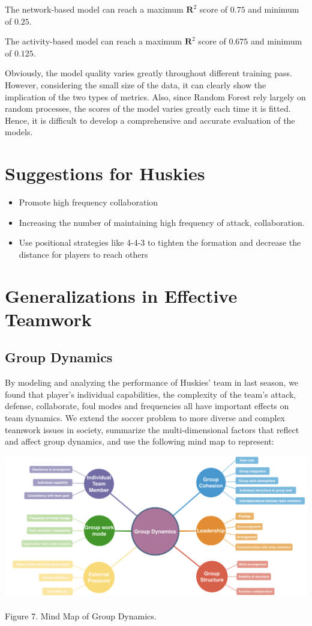 \documentclass{mcmthesis}
\begin{document}
The network-based model can reach a maximum $\mathbf{R}^2$ score of $0.75$ and minimum of $0.25$.

The activity-based model can reach a maximum $\mathbf{R}^2$ score of $0.675$ and minimum
of $0.125$.

Obviously, the model quality varies greatly throughout different training pass.
However, considering the small size of the data, it can clearly show the implication of the two types of metrics. Also, since Random Forest rely largely
on random processes, the scores of the model varies greatly each time it is fitted. Hence, it is difficult to develop a comprehensive and accurate evaluation of the models.


\section{Suggestions for Huskies}
\begin{itemize}
    \item Promote high frequency collaboration
    \item Increasing the number of maintaining high frequency of attack, collaboration. 
    \item Use positional strategies like 4-4-3 to tighten the formation and decrease the distance for players to reach others
\end{itemize}


\section{Generalizations in Effective Teamwork}

\subsection{Group Dynamics}

By modeling and analyzing the performance of Huskies' team in last season, we found that player's individual capabilities, the complexity of the team's attack, defense, collaborate, foul modes and frequencies all have important effects on team dynamics. We extend the soccer problem to more diverse and complex teamwork issues in society, summarize the multi-dimensional factors that reflect and affect group dynamics, and use the following mind map to represent:

\begin{center}
    \includegraphics[scale=0.4]{images/mindmap.png}
    ~\\
    Figure 7. Mind Map of Group Dynamics.
\end{center}
\end{document}
